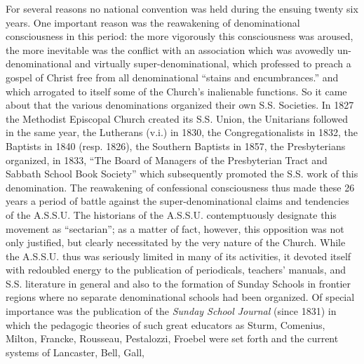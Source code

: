 For several reasons no national convention was held during the ensuing twenty six years. One important reason was the reawakening of denominational consciousness in this period: the more vigorously this consciousness was aroused, the more inevitable was the conflict with an association which was avowedly un-denominational and virtually super-denominational, which professed to preach a gospel of Christ free from all denominational “stains and encumbrances.” and which arrogated to itself some of the Church’s inalienable functions. So it came about that the various denominations organized their own S.S. Societies. In 1827 the Methodist Episcopal Church created its S.S. Union, the Unitarians followed in the same year, the Lutherans (v.i.) in 1830, the Congregationalists in 1832, the Baptists in 1840 (resp. 1826), the Southern Baptists in 1857, the Presbyterians organized, in 1833, “The Board of Managers of the Presbyterian Tract and Sabbath School Book Society” which subsequently promoted the S.S. work of this denomination. The reawakening of confessional consciousness thus made these 26 years a period of battle against the super-denominational claims and tendencies of the A.S.S.U. The historians of the A.S.S.U. contemptuously designate this movement as “sectarian”; as a matter of fact, however, this opposition was not only justified, but clearly necessitated by the very nature of the Church. While the A.S.S.U. thus was seriously limited in many of its activities, it devoted itself with redoubled energy to the publication of periodicals, teachers’ manuals, and S.S. literature in general and also to the formation of Sunday Schools in frontier regions where no separate denominational schools had been organized. Of special importance was the publication of the \emph{Sunday School Journal} (since 1831) in which the pedagogic theories of such great educators as Sturm, Comenius, Milton, Francke, Rousseau, Pestalozzi, Froebel were set forth and the current systems of Lancaster, Bell, Gall,
